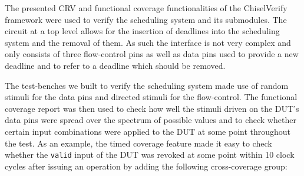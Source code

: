 \documentclass[conference]{IEEEtran}
\newcommand{\martin}[1]{{\color{blue} Martin: #1}}
\begin{document}





The presented CRV and functional coverage functionalities of the ChiselVerify framework were used to verify the scheduling system and its submodules. 
The circuit at a top level allows for the insertion of deadlines into the scheduling system and the removal of them. As such the interface is not very complex and only consists of three flow-control pins as well as data pins used to provide a new deadline and to refer to a deadline which should be removed. 


The test-benches we built to verify the scheduling system made use of random stimuli for the data pins and directed stimuli for the flow-control.
The functional coverage report was then used to check how well the stimuli driven on the DUT's data pins were spread over the spectrum of possible values and to check whether certain input combinations were applied to the DUT at some point throughout the test. 
As an example, the timed coverage feature made it easy to check whether the \texttt{valid} input of the DUT was revoked at some point within 10 clock cycles after issuing an operation by adding the following cross-coverage group:
\end{document}
